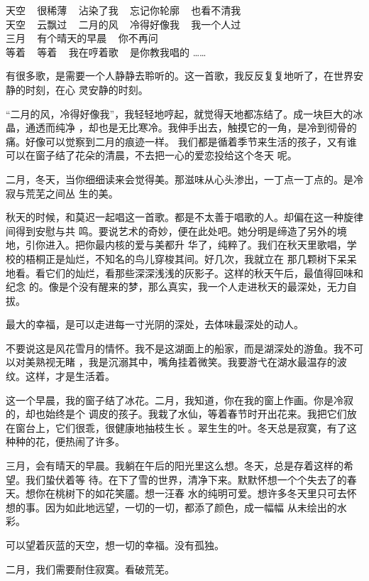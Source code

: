 \documentclass[12pt,a4paper]{article}
\begin{document}
		\longpoem{}{}{}
			天空 ~ 很稀薄 ~ 沾染了我 ~ 忘记你轮廓 ~ 也看不清我 \\
			天空 ~ 云飘过 ~ 二月的风 ~ 冷得好像我 ~ 我一个人过 \\
			三月 ~ 有个晴天的早晨 ~ 你不再问 \\
			等着 ~ 等着 ~ 我在哼着歌 ~ 是你教我唱的 ……
		\endlongpoem

		有很多歌，是需要一个人静静去聆听的。这一首歌，我反反复复地听了，在世界安静的时刻，在心
	灵安静的时刻。

		“二月的风，冷得好像我”，我轻轻地哼起，就觉得天地都冻结了。成一块巨大的冰晶，通透而纯净
	，却也是无比寒冷。我伸手出去，触摸它的一角，是冷到彻骨的痛。好像可以觉察到二月的痕迹一样。
	我们都是循着季节来生活的孩子，又有谁可以在窗子结了花朵的清晨，不去把一心的爱恋投给这个冬天
	呢。

		二月，冬天，当你细细读来会觉得美。那滋味从心头渗出，一丁点一丁点的。是冷寂与荒芜之间丛
	生的美。

		秋天的时候，和莫迟一起唱这一首歌。都是不太善于唱歌的人。却偏在这一种旋律间得到安慰与共
	鸣。要说艺术的奇妙，便在此处吧。她分明是缔造了另外的境地，引你进入。把你最内核的爱与美都升
	华了，纯粹了。我们在秋天里歌唱，学校的梧桐正是灿烂，不知名的鸟儿穿梭其间。好几次，我就立在
	那几颗树下呆呆地看。看它们的灿烂，看那些深深浅浅的灰影子。这样的秋天午后，最值得回味和纪念
	的。像是个没有醒来的梦，那么真实，我一个人走进秋天的最深处，无力自拔。

		最大的幸福，是可以走进每一寸光阴的深处，去体味最深处的动人。

		不要说这是风花雪月的情怀。我不是这湖面上的船家，而是湖深处的游鱼。我不可以对美熟视无睹
	，我是沉溺其中，嘴角挂着微笑。我要游弋在湖水最温存的波纹。这样，才是生活着。

		这一个早晨，我的窗子结了冰花。二月，我知道，你在我的窗上作画。你是冷寂的，却也始终是个
	调皮的孩子。我栽了水仙，等着春节时开出花来。我把它们放在窗台上，它们很乖，很健康地抽枝生长
	。翠生生的叶。冬天总是寂寞，有了这种种的花，便热闹了许多。

		三月，会有晴天的早晨。我躺在午后的阳光里这么想。冬天，总是存着这样的希望。我们蛰伏着等
	待。在下了雪的世界，清净下来。默默怀想一个个失去了的春天。想你在桃树下的如花笑靥。想一汪春
	水的纯明可爱。想许多冬天里只可去怀想的事。因为如此地远望，一切的一切，都添了颜色，成一幅幅
	从未绘出的水彩。

		可以望着灰蓝的天空，想一切的幸福。没有孤独。

		二月，我们需要耐住寂寞。看破荒芜。

	\endwriting
\end{document}
